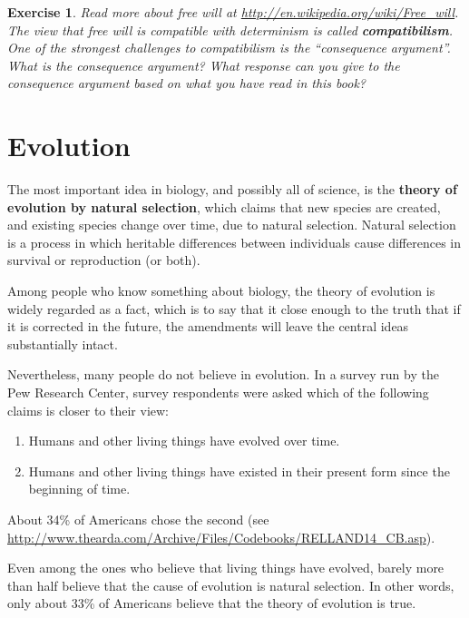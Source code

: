 \documentclass[12pt]{book}
\theoremstyle{exercise}
\newtheorem{exercise}{Exercise}[chapter]
\begin{document}
\begin{exercise}

Read more about free will at
\url{http://en.wikipedia.org/wiki/Free_will}.  The view that free will
is compatible with determinism is called {\bf compatibilism}.  One of
the strongest challenges to compatibilism is the ``consequence
argument''.  What is the consequence argument?  What response can you
give to the consequence argument based on what you have read in this
book?

\end{exercise}





\chapter{Evolution}

The most important idea in biology, and possibly all of science, is the {\bf theory of evolution by natural selection}, which claims that new species are created, and existing species change over time, due to natural selection.  Natural selection is a process in which heritable differences between individuals cause differences in survival or reproduction (or both).

Among people who know something about biology, the theory of evolution is widely regarded as a fact, which is to say that it close enough to the truth that if it is corrected in the future, the amendments will leave the central ideas substantially intact.

Nevertheless, many people do not believe in evolution.  In a survey run by the Pew Research Center, survey respondents were asked which of the following claims is closer to their view:

\begin{enumerate}

\item Humans and other living things have evolved over time.

\item Humans and other living things have existed in their present form since the beginning of time.

\end{enumerate}

About 34\% of Americans chose the second (see \url{http://www.thearda.com/Archive/Files/Codebooks/RELLAND14_CB.asp}).

Even among the ones who believe that living things have evolved, barely more than half believe that the cause of evolution is natural selection.  In other words, only about 33\% of Americans believe that the theory of evolution is true.
\end{document}
